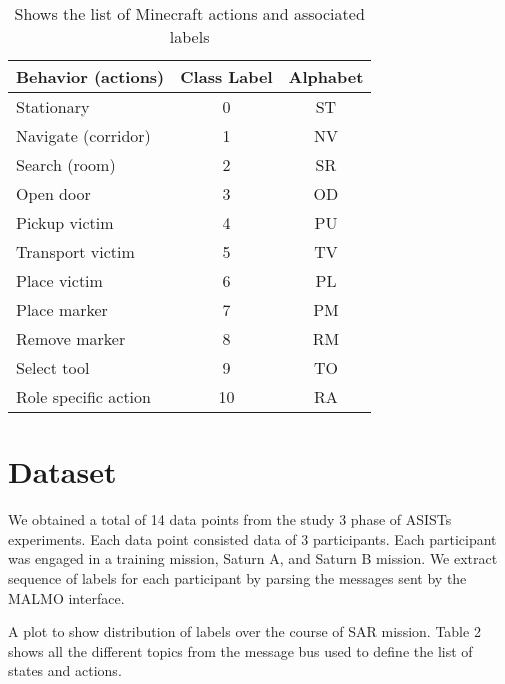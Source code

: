 \documentclass{article}
\begin{document}
\begin{table}[h!]
    \centering
    \begin{tabular}{|l|c|c|}
    \hline
    \textbf{Behavior (actions)} & \textbf{Class Label} & \textbf{Alphabet} \\[1em]
    \hline
    Stationary & 0 & ST \\[0.5em]
    Navigate (corridor) & 1 & NV \\[0.5em]
    Search (room) & 2 & SR \\[0.5em]
    Open door & 3 & OD \\[0.5em]
    Pickup victim & 4 & PU \\[0.5em]
    Transport victim & 5 & TV \\[0.5em]
    Place victim & 6 & PL \\[0.5em]
    Place marker & 7 & PM \\[0.5em]
    Remove marker & 8 & RM \\[0.5em]
    Select tool & 9 & TO \\[0.5em]
    Role specific action & 10 & RA \\[0.5em]
    \hline
    \end{tabular}
    \caption{Shows the list of Minecraft actions and associated labels}
    \label{table:1}
\end{table}

\section*{Dataset}
We obtained a total of 14 data points from the study 3 phase of ASISTs experiments.
Each data point consisted data of 3 participants. Each participant was engaged in
a training mission, Saturn A, and Saturn B mission.
We extract sequence of labels for each participant by parsing the messages sent by 
the MALMO interface.

A plot to show distribution of labels over the course of SAR mission. Table 2 
shows all the different topics from the message bus used to define the list 
of states and actions.
\end{document}
